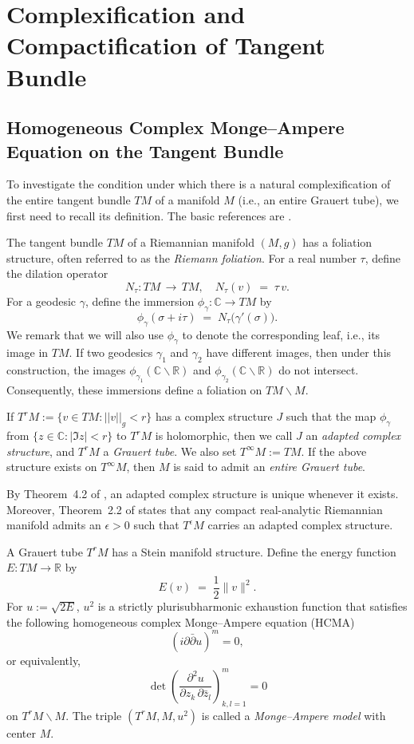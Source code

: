 \documentclass[a4paper, 12pt]{article}
\newcommand{\bC}{\mathbb{C}}
\newcommand{\bR}{\mathbb{R}}
\begin{document}
\section{Complexification and Compactification of Tangent Bundle}\label{sec-MAmodel}
\subsection{Homogeneous Complex Monge--Ampere Equation on the Tangent Bundle}\label{sec-GT}

To investigate the condition under which there is a natural complexification of the entire tangent bundle $TM$ of a manifold $M$ (i.e., an entire Grauert tube), we first need to recall its definition. The basic references are \cite{GS91, LS91}.

The tangent bundle $TM$ of a Riemannian manifold $(M,g)$ has a foliation structure, often referred to as the \emph{Riemann foliation}. For a real number $\tau$, define the dilation operator
\[
N_\tau : TM \,\to\, TM, 
\quad N_\tau(v) \;=\; \tau\,v.
\]
For a geodesic $\gamma$, define the immersion $\phi_\gamma:\bC\rightarrow TM$ by
\[
\phi_\gamma(\sigma+i\tau)\;=\;N_\tau\bigl(\gamma'(\sigma)\bigr).
\]
We remark that we will also use $\phi_\gamma$ to denote the corresponding leaf, i.e., its image in $TM$. If two geodesics $\gamma_1$ and $\gamma_2$ have different images, then under this construction, the images $\phi_{\gamma_1}(\bC\backslash\bR)$ and $\phi_{\gamma_2}(\bC\backslash\bR)$ do not intersect. Consequently, these immersions define a foliation on $TM\backslash M$.

If $T^rM:=\{v \in TM : ||v||_g <r\}$ has a complex structure $J$ such that the map $\phi_{\gamma}$ from $\{z\in\bC:|\Im z| < r\}$ to $T^rM$ is holomorphic, then we call $J$ an \emph{adapted complex structure}, and $T^rM$ a \emph{Grauert tube}. We also set $T^\infty M := TM$. If the above structure exists on $T^\infty M$, then $M$ is said to admit an \emph{entire Grauert tube}.

By Theorem~4.2 of \cite{LS91}, an adapted complex structure is unique whenever it exists. Moreover, Theorem~2.2 of \cite{S91} states that any compact real-analytic Riemannian manifold admits an $\epsilon>0$ such that $T^\epsilon M$ carries an adapted complex structure.

A Grauert tube $T^rM$ has a Stein manifold structure. Define the energy function $E:TM\rightarrow \bR$ by
\[
E(v) \;=\;\frac{1}{2}\|v\|^2.
\]
For $u:=\sqrt{2E}$, $u^2$ is a strictly plurisubharmonic exhaustion function that satisfies the following homogeneous complex Monge--Ampere equation (HCMA)
\[
(i\partial\bar{\partial}u)^m=0,
\]
or equivalently,
\[
\det\!\left(
\frac{\partial^2 u}{\partial z_k\,\partial \bar z_l}
\right)_{k,l=1}^{m} = 0
\]
on $T^rM\backslash M$. The triple $(T^rM,M,u^2)$ is called a \emph{Monge--Ampere model} with center $M$.
\end{document}
